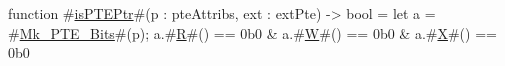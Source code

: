 function #\hyperref[sailRISCVzisPTEPtr]{isPTEPtr}#(p : pteAttribs, ext : extPte) -> bool = {
  let a = #\hyperref[sailRISCVzMkzyPTEzyBits]{Mk\_PTE\_Bits}#(p);
  a.#\hyperref[sailRISCVzR]{R}#() == 0b0 & a.#\hyperref[sailRISCVzW]{W}#() == 0b0 & a.#\hyperref[sailRISCVzX]{X}#() == 0b0
}
